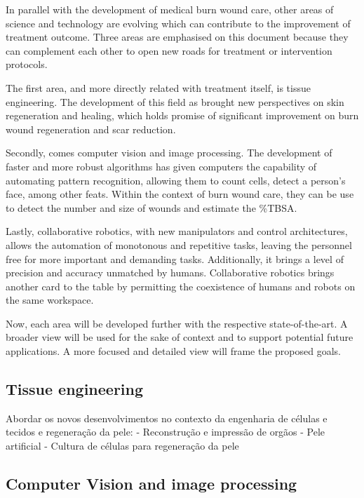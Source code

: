 In parallel with the development of medical burn wound care, other areas of science and technology are evolving which can contribute to the improvement of treatment outcome. Three areas are emphasised on this document because they can complement each other to open new roads for treatment or intervention protocols.

The first area, and more directly related with treatment itself, is tissue engineering. The development of this field as brought new perspectives on skin regeneration and healing, which holds promise of significant improvement on burn wound regeneration and scar reduction. 

Secondly, comes computer vision and image processing. The development of faster and more robust algorithms has given computers the capability of automating pattern recognition, allowing them to count cells, detect a person's face, among other feats. Within the context of burn wound care, they can be use to detect the number and size of wounds and estimate the \%TBSA. 

Lastly, collaborative robotics, with new manipulators and control architectures, allows the automation of monotonous and repetitive tasks, leaving the personnel free for more important and demanding tasks. Additionally, it brings a level of precision and accuracy unmatched by humans. Collaborative robotics brings another card to the table by permitting the coexistence of humans and robots on the same workspace.

\bigskip
Now, each area will be developed further with the respective state-of-the-art. A broader view will be used for the sake of context and to support potential future applications. A more focused and detailed view will frame the proposed goals.

\subsection{Tissue engineering}
\label{subsec:tissue_engineering}

Abordar os novos desenvolvimentos no contexto da engenharia de células e tecidos e regeneração da pele:
- Reconstrução e impressão de orgãos
- Pele artificial
- Cultura de células para regeneração da pele


\subsection{Computer Vision and image processing}
\label{subsec:computer_vision_and_image_processing}

